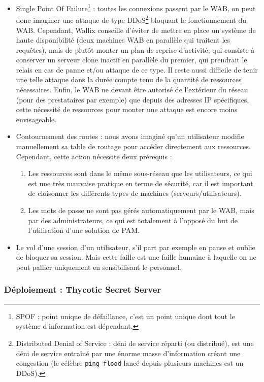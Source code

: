 \begin{itemize}
	\item Single Point Of Failure\footnote{SPOF : point unique de défaillance, c'est un point unique dont tout le système d'information est dépendant.} : toutes les connexions passent par le WAB, on peut donc imaginer une attaque de type DDoS\footnote{Distributed Denial of Service : déni de service réparti (ou distribué), est une déni de service entraîné par une énorme masse d'information créant une congestion (le célèbre \texttt{ping flood} lancé depuis plusieurs machines est un DDoS).} bloquant le fonctionnement du WAB. Cependant, Wallix conseille d'éviter de mettre en place un système de haute disponibilité (deux machines WAB en parallèle qui traitent les requêtes), mais de plutôt monter un plan de reprise d'activité, qui consiste à conserver un serveur clone inactif en parallèle du premier, qui prendrait le relais en cas de panne et/ou attaque de ce type. Il reste aussi difficile de tenir une telle attaque dans la durée compte tenu de la quantité de ressources nécessaires. Enfin, le WAB ne devant être autorisé de l'extérieur du réseau (pour des prestataires par exemple) que depuis des adresses IP spécifiques, cette nécessité de ressources pour monter une attaque est encore moins envisageable.
	\item Contournement des routes : nous avons imaginé qu'un utilisateur modifie manuellement sa table de routage pour accéder directement aux ressources. Cependant, cette action nécessite deux prérequis :
	\begin{enumerate}
		\item Les ressources sont dans le même sous-réseau que les utilisateurs, ce qui est une très mauvaise pratique en terme de sécurité, car il est important de cloisonner les différents types de machines (serveurs/utilisateurs).
		\item Les mots de passe ne sont pas gérés automatiquement par le WAB, mais par des administrateurs, ce qui est totalement à l'opposé du but de l'utilisation d'une solution de PAM.
	\end{enumerate}
	\item Le vol d'une session d'un utilisateur, s'il part par exemple en pause et oublie de bloquer sa session. Mais cette faille est une faille humaine à laquelle on ne peut pallier uniquement en sensibilisant le personnel.
\end{itemize}

\subsubsection{Déploiement : Thycotic Secret Server}
\label{par:depss}

